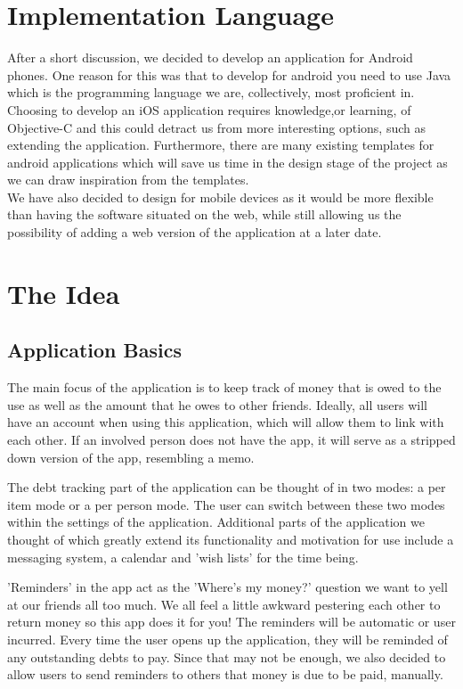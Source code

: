 \documentclass[a4paper,9t]{article}
\begin{document}
\section*{Implementation Language}

After a short discussion, we decided to develop an application for Android phones. One reason for this was that to develop for android you need to use Java which is the programming language we are, collectively, most proficient in. Choosing to develop an iOS application requires knowledge,or learning, of Objective-C and this could detract us from more interesting options, such as extending the application. Furthermore, there are many existing templates for android applications which will save us time in the design stage of the project as we can draw inspiration from the templates. \\
We have also decided to design for mobile devices as it would be more flexible than having the software situated on the web, while still allowing us the possibility of adding a web version of the application at a later date.

\section*{The Idea}

\subsection*{Application Basics}
The main focus of the application is to keep track of money that is owed to the use as well as the amount that he owes to other friends. Ideally, all users will have an account when using this application, which will allow them to link with each other. If an involved person does not have the app, it will serve as a stripped down version of the app, resembling a memo.

The debt tracking part of the application can be thought of in two modes: a per item mode or a per person mode. The user can switch between these two modes within the settings of the application.  
Additional parts of the application we thought of which greatly extend its functionality and motivation for use include a messaging system, a calendar and 'wish lists' for the time being. 

'Reminders' in the app act as the 'Where's my money?' question we want to yell at our friends all too much. We all feel a little awkward pestering each other to return money so this app does it for you!
The reminders will be automatic or user incurred. Every time the user opens up the application, they will be reminded of any outstanding debts to pay. Since that may not be enough, we also decided to allow users to send reminders to others that money is due to be paid, manually. 
\end{document}
